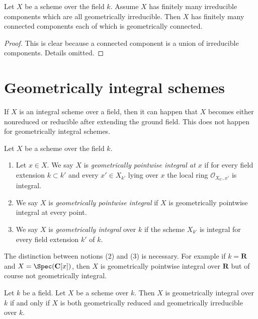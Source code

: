 \begin{lemma}
\label{lemma-irreducible-components-geometrically-irreducible}
Let $X$ be a scheme over the field $k$.
Assume $X$ has finitely many irreducible components which are
all geometrically irreducible.
Then $X$ has finitely many connected components each of which is
geometrically connected.
\end{lemma}

\begin{proof}
This is clear because a connected component is a union of irreducible
components. Details omitted.
\end{proof}







\section{Geometrically integral schemes}
\label{section-geometrically-integral}

\noindent
If $X$ is an integral scheme over a field, then it can happen that $X$
becomes either nonreduced or reducible after extending the ground field.
This does not happen for geometrically integral schemes.

\begin{definition}
\label{definition-geometrically-integral}
Let $X$ be a scheme over the field $k$.
\begin{enumerate}
\item Let $x \in X$. We say $X$ is
{\it geometrically pointwise integral at $x$} if for every
field extension $k \subset k'$ and every $x' \in X_{k'}$ lying over $x$
the local ring $\mathcal{O}_{X_{k'}, x'}$ is integral.
\item We say $X$ is {\it geometrically pointwise integral} if $X$
is geometrically pointwise integral at every point.
\item We say $X$ is {\it geometrically integral} over $k$ if the scheme
$X_{k'}$ is integral for every field extension $k'$ of $k$.
\end{enumerate}
\end{definition}

\noindent
The distinction between notions (2) and (3) is necessary.
For example if $k = \mathbf{R}$ and $X = \Spec(\mathbf{C}[x])$,
then $X$ is geometrically pointwise integral over $\mathbf{R}$ but
of course not geometrically integral.

\begin{lemma}
\label{lemma-geometrically-integral}
Let $k$ be a field.
Let $X$ be a scheme over $k$.
Then $X$ is geometrically integral over $k$ if and only if
$X$ is both geometrically reduced and geometrically irreducible
over $k$.
\end{lemma}


